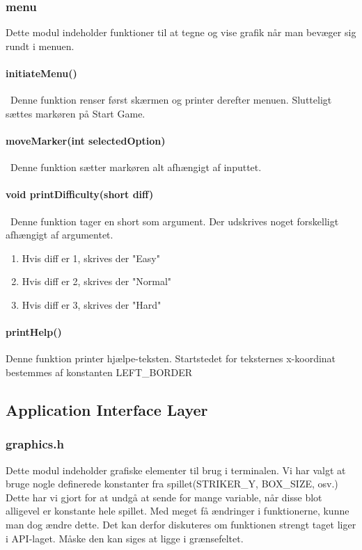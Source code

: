 \subsubsection{menu}
Dette modul indeholder funktioner til at tegne og vise grafik når man bevæger sig rundt i menuen.
\paragraph{initiateMenu()}\
Denne funktion renser først skærmen og printer derefter menuen. Slutteligt sættes markøren på Start Game.
\paragraph{moveMarker(int selectedOption)}\
Denne funktion sætter markøren alt afhængigt af inputtet.
\paragraph{void printDifficulty(short diff)}\
Denne funktion tager en short som argument. Der udskrives noget forskelligt afhængigt af argumentet.
\begin{enumerate}
\item Hvis diff er 1, skrives der "Easy"
\item Hvis diff er 2, skrives der "Normal"
\item Hvis diff er 3, skrives der "Hard"
\end{enumerate}
\paragraph{printHelp()}
Denne funktion printer hjælpe-teksten. Startstedet for teksternes x-koordinat bestemmes af konstanten LEFT\_BORDER

\subsection{Application Interface Layer}
\subsubsection{graphics.h}
Dette modul indeholder grafiske elementer til brug i terminalen. Vi har valgt at bruge nogle definerede konstanter fra spillet(STRIKER\_Y, BOX\_SIZE, osv.) Dette har vi gjort for at undgå at sende for mange variable, når disse blot alligevel er konstante hele spillet. Med meget få ændringer i funktionerne, kunne man dog ændre dette. Det kan derfor diskuteres om funktionen strengt taget liger i API-laget. Måske den kan siges at ligge i grænsefeltet.
